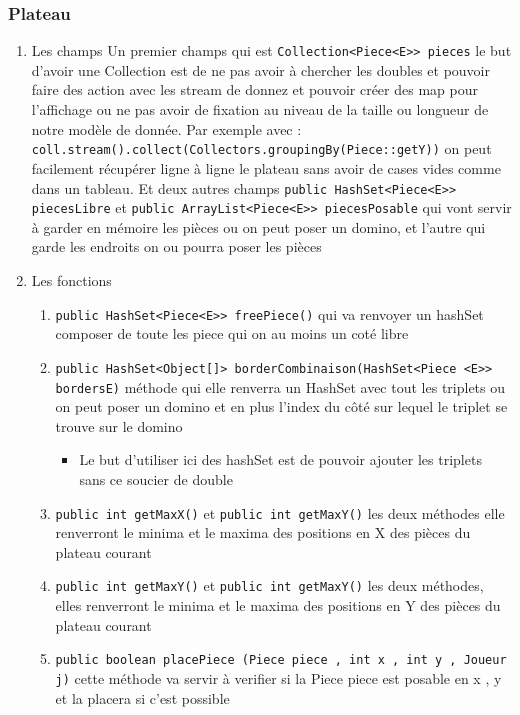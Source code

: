 \documentclass[11pt]{article}
\begin{document}
\subsubsection{Plateau}
\label{sec:org5a2c425}
\begin{enumerate}
\item Les champs
\label{sec:org8b998f1}
Un premier champs qui est \texttt{Collection<Piece<E>> pieces} le but d'avoir une Collection est de ne pas avoir à chercher les doubles et pouvoir faire des action avec les stream de donnez et pouvoir créer des map pour l'affichage ou ne pas avoir de fixation au niveau de la taille ou longueur de notre modèle de donnée. Par exemple avec : \texttt{coll.stream().collect(Collectors.groupingBy(Piece::getY))} on peut facilement récupérer ligne à ligne le plateau sans avoir de cases vides comme dans un tableau. Et deux autres champs \texttt{public HashSet<Piece<E>> piecesLibre} et \texttt{public ArrayList<Piece<E>> piecesPosable} qui vont servir à garder en mémoire les pièces ou on peut poser un domino, et l'autre qui garde les endroits on ou pourra poser les pièces 
\item Les fonctions
\label{sec:orgf2bcc08}
\begin{enumerate}
\item \texttt{public HashSet<Piece<E>> freePiece()} qui va renvoyer un hashSet composer de toute les piece qui on au moins un coté libre
\item \texttt{public HashSet<Object[]> borderCombinaison(HashSet<Piece <E>> bordersE)} méthode qui elle renverra un HashSet avec tout les triplets ou on peut poser un domino et en plus l'index du côté sur lequel le triplet se trouve sur le domino 
\begin{itemize}
\item Le but d'utiliser ici des hashSet est de pouvoir ajouter les triplets sans ce soucier de double
\end{itemize}
\item \texttt{public int getMaxX()} et \texttt{public int getMaxY()} les deux méthodes elle renverront le minima et le maxima des positions en X des pièces du plateau courant
\item \texttt{public int getMaxY()} et \texttt{public int getMaxY()} les deux méthodes, elles renverront le minima et le maxima des positions en Y des pièces du plateau courant
\item \texttt{public boolean placePiece (Piece piece , int x , int y , Joueur j)} cette méthode va servir à verifier si la Piece piece est posable en x , y et la placera si c'est possible

\end{enumerate}
\end{enumerate}
\end{document}
